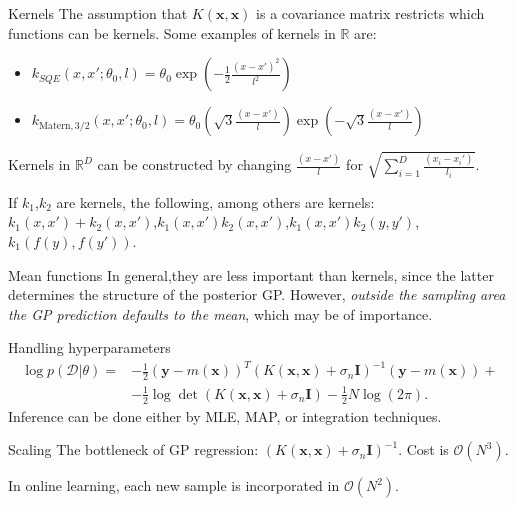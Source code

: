 \documentclass{beamer}
\begin{document}
\begin{frame}{}
\begin{block}{Kernels}
The assumption that $K(\mathbf{x},\mathbf{x})$ is a covariance matrix restricts which functions can be kernels. Some examples of kernels in $\mathbb{R}$ are:
\begin{itemize}
\item $k_{SQE}(x,x';\theta_0,l) = \theta_0 \exp \left(-\frac{1}{2} \frac{(x-x')^2}{l^2} \right)$
\item $k_{\text{Matern},3/2}(x,x';\theta_0,l) = \theta_0 \left( \sqrt{3} \frac{(x-x')}{l} \right) \exp \left(-\sqrt{3} \frac{(x-x')}{l}\right)$
\end{itemize}
Kernels in $\mathbb{R}^D$ can be constructed by changing $\frac{(x-x')}{l}$ for $\sqrt{\sum_{i=1}^D \frac{(x_i-x_i')}{l_i}}$.

If $k_1$,$k_2$ are kernels, the following, among others are kernels: $k_1(x,x')+k_2(x,x')$,$k_1(x,x')k_2(x,x')$,$k_1(x,x')k_2(y,y')$,$k_1(f(y),f(y'))$.
\end{block}
\begin{block}{Mean functions}
In general,they are less important than kernels, since the latter determines the structure of the posterior GP. However, \textit{outside the sampling area the GP prediction defaults to the mean}, which may be of importance.
\end{block}
\end{frame}

\begin{frame}{}
\begin{block}{Handling hyperparameters}
\begin{equation*}
\begin{split}
\log p(\mathcal{D}|\theta) = & -\frac{1}{2}(\mathbf{y} - m(\mathbf{x}))^T (K(\mathbf{x},\mathbf{x}) + \sigma_n \mathbf{I})^{-1} (\mathbf{y} - m(\mathbf{x})) + \\
&-\frac{1}{2} \log \det (K(\mathbf{x},\mathbf{x}) + \sigma_n \mathbf{I}) - \frac{1}{2} N \log(2\pi).
\end{split}
\end{equation*}
Inference can be done either by MLE, MAP, or integration techniques.
\end{block}
\begin{block}{Scaling}
The bottleneck of GP regression: $(K(\mathbf{x},\mathbf{x}) + \sigma_n \mathbf{I})^{-1}$. Cost is $\mathcal{O}(N^3)$.

In online learning, each new sample is incorporated in $\mathcal{O}(N^2)$.
\end{block}

\end{frame}
\end{document}
